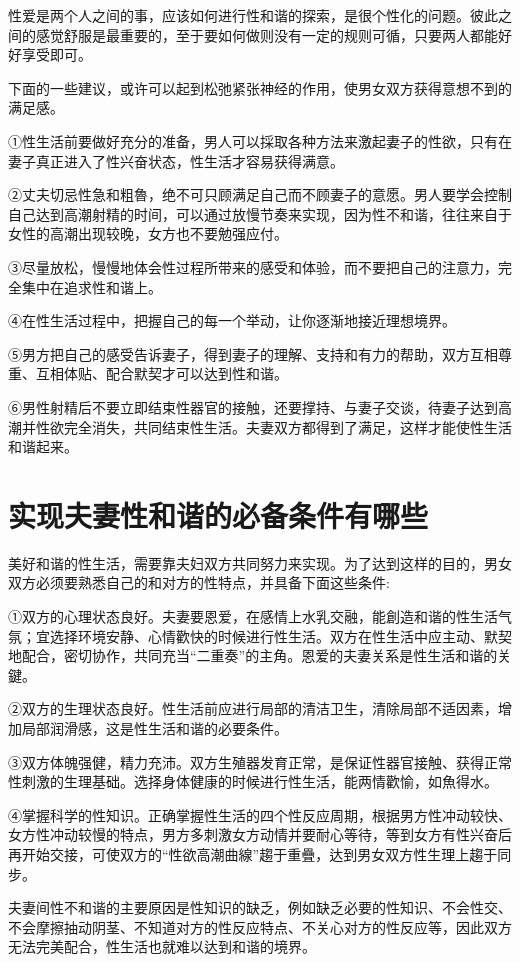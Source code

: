 \documentclass[12pt,UTF8]{ctexbook}
\begin{document}
性爱是两个人之间的事，应该如何进行性和谐的探索，是很个性化的问题。彼此之间的感觉舒服是最重要的，至于要如何做则没有一定的规则可循，只要两人都能好好享受即可。

下面的一些建议，或许可以起到松弛紧张神经的作用，使男女双方获得意想不到的满足感。

①性生活前要做好充分的准备，男人可以採取各种方法来激起妻子的性欲，只有在妻子真正进入了性兴奋状态，性生活才容易获得满意。

②丈夫切忌性急和粗魯，绝不可只顾满足自己而不顾妻子的意愿。男人要学会控制自己达到高潮射精的时间，可以通过放慢节奏来实现，因为性不和谐，往往来自于女性的高潮出现较晚，女方也不要勉强应付。

③尽量放松，慢慢地体会性过程所带来的感受和体验，而不要把自己的注意力，完全集中在追求性和谐上。

④在性生活过程中，把握自己的每一个举动，让你逐渐地接近理想境界。

⑤男方把自己的感受告诉妻子，得到妻子的理解、支持和有力的帮助，双方互相尊重、互相体贴、配合默契才可以达到性和谐。

⑥男性射精后不要立即结束性器官的接触，还要撑持、与妻子交谈，待妻子达到高潮并性欲完全消失，共同结束性生活。夫妻双方都得到了满足，这样才能使性生活和谐起来。

\section{实现夫妻性和谐的必备条件有哪些}

美好和谐的性生活，需要靠夫妇双方共同努力来实现。为了达到这样的目的，男女双方必须要熟悉自己的和对方的性特点，并具备下面这些条件:

①双方的心理状态良好。夫妻要恩爱，在感情上水乳交融，能創造和谐的性生活气氛；宜选择环境安静、心情歡快的时候进行性生活。双方在性生活中应主动、默契地配合，密切协作，共同充当“二重奏”的主角。恩爱的夫妻关系是性生活和谐的关鍵。

②双方的生理状态良好。性生活前应进行局部的清洁卫生，清除局部不适因素，增加局部润滑感，这是性生活和谐的必要条件。

③双方体魄强健，精力充沛。双方生殖器发育正常，是保证性器官接触、获得正常性刺激的生理基础。选择身体健康的时候进行性生活，能两情歡愉，如魚得水。

④掌握科学的性知识。正确掌握性生活的四个性反应周期，根据男方性冲动较快、女方性冲动较慢的特点，男方多刺激女方动情并要耐心等待，等到女方有性兴奋后再开始交接，可使双方的“性欲高潮曲線”趨于重疊，达到男女双方性生理上趨于同步。

夫妻间性不和谐的主要原因是性知识的缺乏，例如缺乏必要的性知识、不会性交、不会摩擦抽动阴茎、不知道对方的性反应特点、不关心对方的性反应等，因此双方无法完美配合，性生活也就难以达到和谐的境界。
\end{document}
